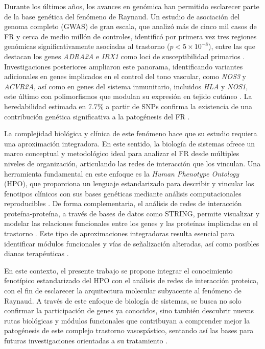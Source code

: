 Durante los últimos años, los avances en genómica han permitido esclarecer parte de la base genética del fenómeno de Raynaud. Un estudio de asociación del genoma completo (GWAS) de gran escala, que analizó más de cinco mil casos de FR y cerca de medio millón de controles, identificó por primera vez tres regiones genómicas significativamente asociadas al trastorno ($p < 5 \times 10^{-8}$), entre las que destacan los genes \textit{ADRA2A} e \textit{IRX1} como loci de susceptibilidad primarios \cite{Hartmann2023}. Investigaciones posteriores ampliaron este panorama, identificando variantes adicionales en genes implicados en el control del tono vascular, como \textit{NOS3} y \textit{ACVR2A}, así como en genes del sistema inmunitario, incluidos \textit{HLA} y \textit{NOS1}, este último con polimorfismos que modulan su expresión en tejido cutáneo \cite{deAlmeidaTervi2024, Smolina2018, Hughes2017}. La heredabilidad estimada en 7.7\% a partir de SNPs confirma la existencia de una contribución genética significativa a la patogénesis del FR \cite{Hartmann2023}.  

La complejidad biológica y clínica de este fenómeno hace que su estudio requiera una aproximación integradora. En este sentido, la biología de sistemas ofrece un marco conceptual y metodológico ideal para analizar el FR desde múltiples niveles de organización, articulando las redes de interacción que los vinculan. Una herramienta fundamental en este enfoque es la \textit{Human Phenotype Ontology} (HPO), que proporciona un lenguaje estandarizado para describir y vincular los fenotipos clínicos con sus bases genéticas mediante análisis computacionales reproducibles \cite{Khler2021, Robinson2008, Groza2023}. De forma complementaria, el análisis de redes de interacción proteína-proteína, a través de bases de datos como STRING, permite visualizar y modelar las relaciones funcionales entre los genes y las proteínas implicadas en el trastorno \cite{Szklarczyk2025, Orchard2014}. Este tipo de aproximaciones integradoras resulta esencial para identificar módulos funcionales y vías de señalización alteradas, así como posibles dianas terapéuticas \cite{Szklarczyk2025, Naylor2010, Fischer2025, Ideker2011}.  

En este contexto, el presente trabajo se propone integrar el conocimiento fenotípico estandarizado del HPO con el análisis de redes de interacción proteica, con el fin de esclarecer la arquitectura molecular subyacente al fenómeno de Raynaud. A través de este enfoque de biología de sistemas, se busca no solo confirmar la participación de genes ya conocidos, sino también descubrir nuevas rutas biológicas y módulos funcionales que contribuyan a comprender mejor la patogénesis de este complejo trastorno vasospástico, sentando así las bases para futuras investigaciones orientadas a su tratamiento \cite{Naylor2010, Fischer2025, Barabsi2011}.
